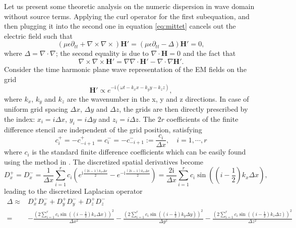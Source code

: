 \documentclass[a4paper,10pt]{article}
\begin{document}
Let us present some theoretic analysis on the numeric dispersion in wave domain without source terms. Applying the curl operator for the first subequation, and then plugging it into the second one in equation \eqref{eq:mittet} cancels out the electric field such that
\begin{equation}\label{eq:disp}
(\mu\epsilon \partial_{tt} + \nabla\times\nabla\times)\mathbf{H}'
=(\mu\epsilon \partial_{tt} - \Delta)\mathbf{H}'=0,
\end{equation}
where $\Delta=\nabla\cdot \nabla$; the second equality is due to $\nabla \cdot\mathbf{H} = 0$ and the fact that
\begin{equation}\label{eq:curlcurl}
  \nabla\times\nabla\times\mathbf{H}'=\nabla\nabla\cdot\mathbf{H}'-\nabla\cdot\nabla\mathbf{H}'.
\end{equation}
Consider the time harmonic plane wave representation of the EM fields on the grid 
\begin{equation}
  \mathbf{H}' \propto e^{-\mathrm{i}(\omega t - k_x  x - k_y  y - k_z z)},
\end{equation}
where $k_x$, $k_y$ and $k_z$ are the wavenumber in the x, y and z directions.  In case of uniform grid spacing $\Delta x$, $\Delta y$ and $\Delta z$, the grids are then directly prescribed by the index: $x_i=i\Delta x$, $y_i=i\Delta y$ and $z_i=i\Delta z$. The $2r$ coefficients of the finite difference stencil are independent of the grid position, satisfying 
\begin{equation}
  c_i^+ = -c_{-i+1}^+ =  c_i^- =-c_{-i+1}^-:=\frac{c_i}{\Delta x}, \quad i=1,\cdots, r
\end{equation}
where $c_i$ is the standard finite difference coefficients which can be easily found using the method in \citep{Fornberg_1998_NFD}. The discretized spatial derivatives become
\begin{equation}
  D_x^+=D_x^-=\frac{1}{\Delta x}\sum_{i=1}^r c_i (e^{\mathrm{i}\frac{(2i-1)k_x\Delta x}{2}}-e^{-\mathrm{i}\frac{(2i-1)k_x\Delta x}{2}})
  =\frac{2\mathrm{i}}{\Delta x}\sum_{i=1}^r c_i \sin((i-\frac{1}{2})k_x\Delta x),
\end{equation}
leading to the discretized Laplacian operator
\begin{equation}
  \begin{split}
  \Delta \approx &D_x^+D_x^- + D_y^+D_y^- + D_z^+D_z^-\\
  =& -\frac{(2\sum_{i=1}^r c_i \sin((i-\frac{1}{2})k_x\Delta x))^2}{\Delta x^2}
  -\frac{(2\sum_{i=1}^r c_i \sin((i-\frac{1}{2})k_y\Delta y))^2}{\Delta y^2}
  -\frac{(2\sum_{i=1}^r c_i \sin((i-\frac{1}{2})k_z\Delta z))^2}{\Delta z^2}\\
  \end{split}
\end{equation}
\end{document}
